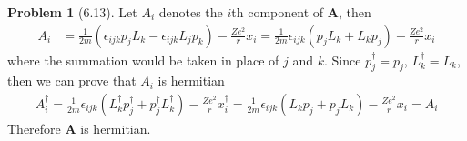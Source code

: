 \documentclass[twoside,11pt]{article}
\theoremstyle{definition}
\newtheorem{problem}{Problem}
\theoremstyle{remark}
\begin{document}
\begin{problem}[6.13]
Let $A_i$ denotes the $i$th component of $\mathbf{A}$, then 
\begin{align*}
    A_i &= \frac{1}{2m}(
        \epsilon_{ijk}p_jL_k - \epsilon_{ijk}L_jp_k
    ) - \frac{Ze^2 }{r}x_i = \frac{1}{2m}\epsilon_{ijk}
    (p_jL_k + L_kp_j) - \frac{Ze^2}{r}x_i
\end{align*}
where the summation would be taken in place of $j$ and $k$.
Since $p_j^\dagger=p_j$, $L_k^\dagger=L_k$, then we can prove that
$A_i$ is hermitian
\begin{align*}
    A_i^\dagger  = 
    \frac{1}{2m}\epsilon_{ijk}
    (L_k^\dagger p_j^\dagger + p_j^\dagger L_k^\dagger) - \frac{Ze^2}{r}x_i^\dagger
    =
    \frac{1}{2m}\epsilon_{ijk}
    (L_kp_j+ p_jL_k) - \frac{Ze^2}{r}x_i = A_i
\end{align*}
Therefore $\mathbf{A}$ is hermitian.


\end{problem}
\end{document}
